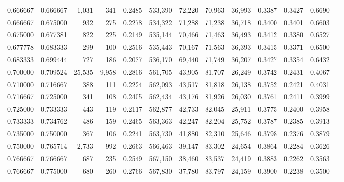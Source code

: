 \begin{tabular}{rrrrrrrrrrrrr}
0.666667 & 0.666667 &  1,031 &    341 &                                     0.2485 & 533,390 &  72,220 &  70,963 &  36,993 & 0.3387 & 0.3427 & 0.6690 \\
0.666667 & 0.675000 &    932 &    275 &                                     0.2278 & 534,322 &  71,288 &  71,238 &  36,718 & 0.3400 & 0.3401 & 0.6603 \\
0.675000 & 0.677381 &    822 &    225 &                                     0.2149 & 535,144 &  70,466 &  71,463 &  36,493 & 0.3412 & 0.3380 & 0.6527 \\
0.677778 & 0.683333 &    299 &    100 &                                     0.2506 & 535,443 &  70,167 &  71,563 &  36,393 & 0.3415 & 0.3371 & 0.6500 \\
0.683333 & 0.699444 &    727 &    186 &                                     0.2037 & 536,170 &  69,440 &  71,749 &  36,207 & 0.3427 & 0.3354 & 0.6432 \\
0.700000 & 0.709524 & 25,535 &  9,958 &                                     0.2806 & 561,705 &  43,905 &  81,707 &  26,249 & 0.3742 & 0.2431 & 0.4067 \\
0.710000 & 0.716667 &    388 &    111 &                                     0.2224 & 562,093 &  43,517 &  81,818 &  26,138 & 0.3752 & 0.2421 & 0.4031 \\
0.716667 & 0.725000 &    341 &    108 &                                     0.2405 & 562,434 &  43,176 &  81,926 &  26,030 & 0.3761 & 0.2411 & 0.3999 \\
0.725000 & 0.733333 &    443 &    119 &                                     0.2117 & 562,877 &  42,733 &  82,045 &  25,911 & 0.3775 & 0.2400 & 0.3958 \\
0.733333 & 0.734762 &    486 &    159 &                                     0.2465 & 563,363 &  42,247 &  82,204 &  25,752 & 0.3787 & 0.2385 & 0.3913 \\
0.735000 & 0.750000 &    367 &    106 &                                     0.2241 & 563,730 &  41,880 &  82,310 &  25,646 & 0.3798 & 0.2376 & 0.3879 \\
0.750000 & 0.765714 &  2,733 &    992 &                                     0.2663 & 566,463 &  39,147 &  83,302 &  24,654 & 0.3864 & 0.2284 & 0.3626 \\
0.766667 & 0.766667 &    687 &    235 &                                     0.2549 & 567,150 &  38,460 &  83,537 &  24,419 & 0.3883 & 0.2262 & 0.3563 \\
0.766667 & 0.775000 &    680 &    260 &                                     0.2766 & 567,830 &  37,780 &  83,797 &  24,159 & 0.3900 & 0.2238 & 0.3500 \\

\end{tabular}
